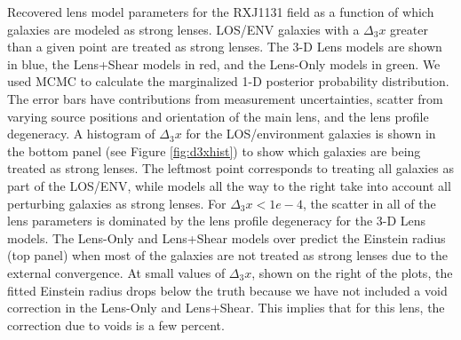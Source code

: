 \label{fig:RXJ1131} Recovered lens model parameters for the RXJ1131 field as a function of which galaxies are modeled as strong lenses. LOS/ENV galaxies with a $\Delta_3 x$ greater than a given point are treated as strong lenses. The 3-D Lens models are shown in blue, the Lens+Shear models in red, and the Lens-Only models in green. We used MCMC to calculate the marginalized 1-D posterior probability distribution. The error bars have contributions from measurement uncertainties, scatter from varying source positions and orientation of the main lens, and the lens profile degeneracy. A histogram of $\Delta_3 x$ for the LOS/environment galaxies is shown in the bottom panel (see Figure \ref{fig:d3xhist}) to show which galaxies are being treated as strong lenses. The leftmost point corresponds to treating all galaxies as part of the LOS/ENV, while models all the way to the right take into account all perturbing galaxies as strong lenses. For $\Delta_3 x < 1e-4$, the scatter in all of the lens parameters is dominated by the lens profile degeneracy for the 3-D Lens models. The Lens-Only and Lens+Shear models over predict the Einstein radius (top panel) when most of the galaxies are not treated as strong lenses due to the external convergence. At small values of $\Delta_3 x$, shown on the right of the plots, the fitted Einstein radius drops below the truth because we have not included a void correction in the Lens-Only and Lens+Shear. This implies that for this lens, the correction due to voids is a few percent.